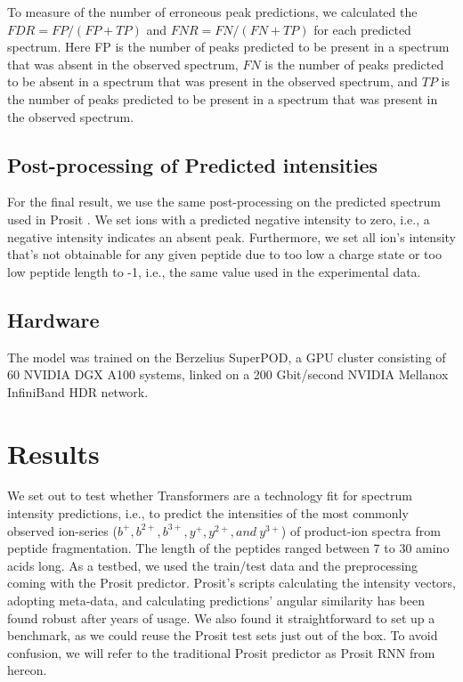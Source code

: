 \documentclass[10pt,a4paper]{article}
\begin{document}
To measure of the number of erroneous peak predictions, we calculated the $FDR=FP/(FP+TP)$ and $FNR=FN/(FN+TP)$ for each predicted spectrum. Here FP is the number of peaks predicted to be present in a spectrum that was absent in the observed spectrum, $FN$ is the number of peaks predicted to be absent in a spectrum that was present in the observed spectrum, and $TP$ is the number of peaks predicted to be present in a spectrum that was present in the observed spectrum.

\subsection*{Post-processing of Predicted intensities}
For the final result, we use the same post-processing on the predicted spectrum used in Prosit ​\cite{Gessulat2019-el}. We set ions with a predicted negative intensity to zero, i.e., a negative intensity indicates an absent peak. Furthermore, we set all ion's intensity that's not obtainable for any given peptide due to too low a charge state or too low peptide length to -1, i.e., the same value used in the experimental data.

\subsection*{Hardware}

The model was trained on the Berzelius SuperPOD, a GPU cluster consisting of 60 NVIDIA DGX A100 systems, linked on a 200 Gbit/second NVIDIA Mellanox InfiniBand HDR network.

\section*{Results}
We set out to test whether Transformers are a technology fit for spectrum intensity predictions, i.e., to predict the intensities of the most commonly observed ion-series ($b^+, b^{2+}, b^{3+}, y^{+}, y^{2+}, and\ y^{3+}$) of product-ion spectra from peptide fragmentation. The length of the peptides ranged between 7 to 30  amino acids long. As a testbed, we used the train/test data and the preprocessing coming with the Prosit predictor. Prosit’s scripts calculating the intensity vectors, adopting meta-data, and calculating predictions’ angular similarity has been found robust after years of usage. We also found it straightforward to set up a benchmark, as we could reuse the Prosit test sets just out of the box. To avoid confusion, we will refer to the traditional Prosit predictor as Prosit RNN from hereon.
\end{document}
